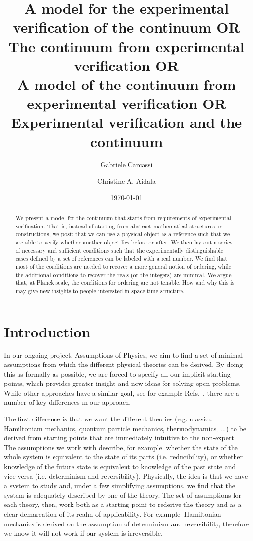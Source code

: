 \documentclass{article}
\title{A model for the experimental verification of the continuum  OR \\ The continuum from experimental verification OR \\ A model of the continuum from experimental verification OR \\ Experimental verification and the continuum}
\author[1]{Gabriele Carcassi}
\author[1]{Christine A. Aidala}
\affil[1]{
	Physics Department\\
	University of Michigan
	}
\date{\today}
\begin{document}
\maketitle


\begin{abstract}
We present a model for the continuum that starts from requirements of experimental verification. That is, instead of starting from abstract mathematical structures or constructions, we posit that we can use a physical object as a reference such that we are able to verify whether another object lies before or after. We then lay out a series of necessary and sufficient conditions such that the experimentally distinguishable cases defined by a set of references can be labeled with a real number. We find that most of the conditions are needed to recover a more general notion of ordering, while the additional conditions to recover the reals (or the integers) are minimal. We argue that, at Planck scale, the conditions for ordering are not tenable. How and why this is may give new insights to people interested in space-time structure.
\end{abstract}

\section{Introduction}

In our ongoing project, Assumptions of Physics, we aim to find a set of minimal assumptions from which the different physical theories can be derived. By doing this as formally as possible, we are forced to specify all our implicit starting points, which provides greater insight and new ideas for solving open problems. While other approaches have a similar goal, see for example Refs.~\cite{PhysRevA.84.012311,QLogicReview,Hardy:2001jk,ludwig_hein_2013}, there are a number of key differences in our approach.

The first difference is that we want the different theories (e.g. classical Hamiltoniam mechanics, quantum particle mechanics, thermodynamics, ...) to be derived from starting points that are immediately intuitive to the non-expert. The assumptions we work with describe, for example, whether the state of the whole system is equivalent to the state of its parts (i.e. reducibility), or whether knowledge of the future state is equivalent to knowledge of the past state and vice-versa (i.e. determinism and reversibility). Physically, the idea is that we have a system to study and, under a few simplifying assumptions, we find that the system is adequately described by one of the theory. The set of assumptions for each theory, then, work both as a starting point to rederive the theory and as a clear demarcation of its realm of applicability. For example, Hamiltonian mechanics is derived on the assumption of determinism and reversibility, therefore we know it will not work if our system is irreversible.
\end{document}
